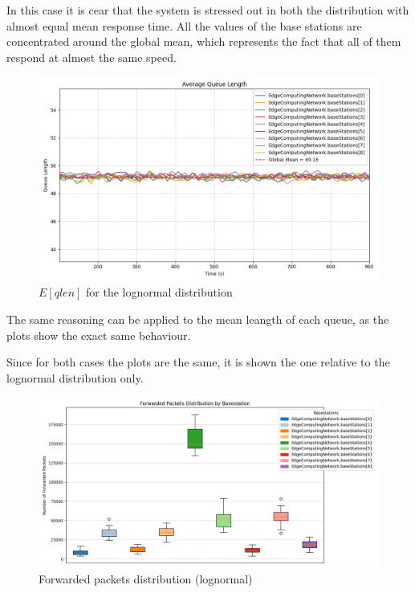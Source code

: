 \documentclass{report}
\begin{document}
In this case it is cear that the system is stressed out in both the distribution with almost equal mean response time. All the values of the base stations are concentrated around the global mean, which represents the fact that all of them respond at almost the same speed.

\begin{figure}[H]
    \centering
    \includegraphics[width=\textwidth]{img/plots/log_1e4_B/qlen.png}
    \caption{$E[qlen]$ for the lognormal distribution}
\end{figure}


\begin{flushleft}
The same reasoning can be applied to the mean leangth of each queue, as the plots show the exact same behaviour.
\vspace{1em}

Since for both cases the plots are the same, it is shown the one relative to the lognormal distribution only.
\end{flushleft}
\begin{figure}[H]
    \centering
    \includegraphics[width=\textwidth]{img/plots/log_1e4_B/forwarded.png}
    \caption{Forwarded packets distribution (lognormal)}
\end{figure}
\end{document}
